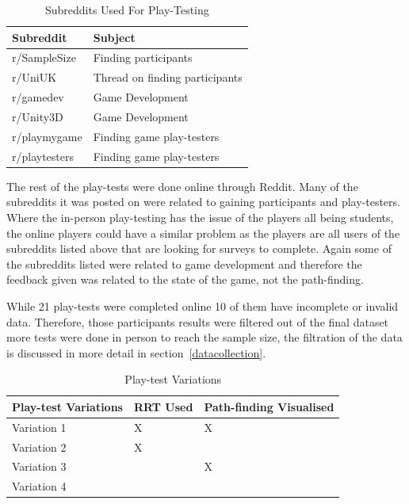 \documentclass[journal]{IEEEtran}
\begin{document}
	\begin{table}[H]
		\centering
		\caption{Subreddits Used For Play-Testing}
		\label{table:Subreddits}
		\def\arraystretch{1.5}
		\begin{tabular}{ |l|l|}
			\hline
			\textbf{Subreddit}        & \textbf{Subject} \\     \hline
			r/SampleSize              & Finding participants  \\ \hline
			r/UniUK                   & Thread on finding participants \\ \hline
			r/gamedev                 & Game Development \\ \hline
			r/Unity3D                 & Game Development \\ \hline
			r/playmygame              & Finding game play-testers \\ \hline
			r/playtesters             & Finding game play-testers \\ \hline
		\end{tabular}
	\end{table}
	
	The rest of the play-tests were done online through Reddit. Many of the subreddits it was posted on were related to gaining participants and play-testers. Where the in-person play-testing has the issue of the players all being students, the online players could have a similar problem as the players are all users of the subreddits listed above that are looking for surveys to complete. Again some of the subreddits listed were related to game development and therefore the feedback given was related to the state of the game, not the path-finding.     
	
	While 21 play-tests were completed online 10 of them have incomplete or invalid data. Therefore, those participants results were filtered out of the final dataset more tests were done in person to reach the sample size, the filtration of the data is discussed in more detail in section~\ref{datacollection}.     
	
	\begin{table}[H]
		\centering
		\caption{Play-test Variations}
		\label{table:PlaytestVariations}
		\def\arraystretch{1.5}
		\begin{tabular}{ |l|l|l|}
			\hline
			\textbf{Play-test Variations} & \textbf{RRT Used}& \textbf{Path-finding Visualised} \\ \hline
			Variation 1  &  X & X \\ \hline
			Variation 2  &  X &  \\ \hline
			Variation 3  &    & X \\ \hline
			Variation 4  &    &  \\ \hline
		\end{tabular}
	\end{table}
	
\end{document}
